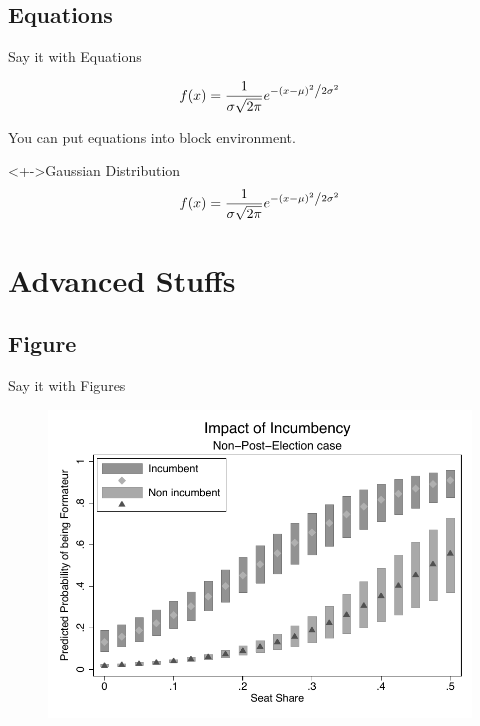 \documentclass{beamer}
\begin{document}
\subsection{Equations}

\begin{frame}{Say it with Equations}

\begin{equation}
f(x) = \frac{1}{{\sigma \sqrt {2\pi } }}e^{{{ - \left( {x - \mu } \right)^2 } \mathord{\left/ {\vphantom {{ - \left( {x - \mu } \right)^2 } {2\sigma ^2 }}} \right. \kern-\nulldelimiterspace} {2\sigma ^2 }}}
\end{equation}

  \vspace*{.5cm}
You can put equations into block environment.
  \vspace*{.5cm}

\begin{block}<+->{Gaussian Distribution}
\begin{equation}
f(x) = \frac{1}{{\sigma \sqrt {2\pi } }}e^{{{ - \left( {x - \mu } \right)^2 } \mathord{\left/ {\vphantom {{ - \left( {x - \mu } \right)^2 } {2\sigma ^2 }}} \right. \kern-\nulldelimiterspace} {2\sigma ^2 }}}	
\end{equation}
\end{block}

\end{frame}

\section{Advanced Stuffs}

\subsection{Figure}

\begin{frame}{Say it with Figures}

    \begin{figure}
      \scalebox{0.7}
      {
        \includegraphics{examplefig}
      }
    \end{figure}

\end{frame}
\end{document}
